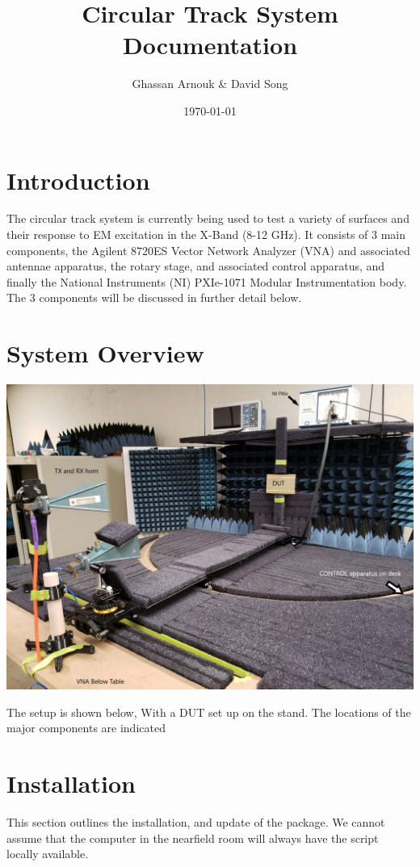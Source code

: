 \documentclass[hidelinks]{article}
\title{Circular Track System Documentation}
\author{Ghassan Arnouk \& David Song}
\date{\today}
\begin{document}
\maketitle
\clearpage

\tableofcontents
\clearpage

\listoffigures
\clearpage

\lstlistoflistings
\clearpage

\section{Introduction}
The circular track system is currently being used to test a variety of surfaces and their response to EM excitation in the X-Band (8-12 GHz). It consists of 3 main components, the Agilent 8720ES Vector Network Analyzer (VNA) and associated antennae apparatus, the rotary stage, and associated control apparatus, and finally the National Instruments (NI) PXIe-1071 Modular Instrumentation body. The 3 components will be discussed in further detail below.
\clearpage
\section{System Overview}
\begin{center}
    \includegraphics[width=\textwidth]{annotated_figure.jpg}
\end{center}
The setup is shown below, With a DUT set up on the stand. The locations of the major components are indicated

\section{Installation}
This section outlines the installation, and update of the package. We cannot assume that the computer in the nearfield room will always have the script locally available. 
\end{document}
